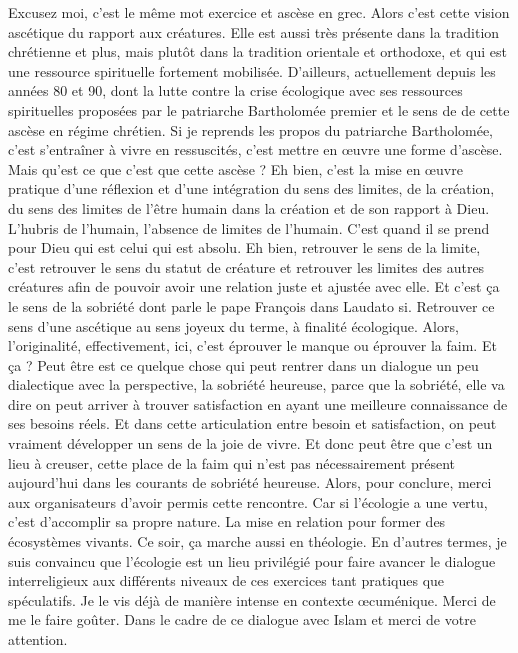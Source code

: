 Excusez moi, c'est le même mot exercice et ascèse en grec. Alors c'est cette vision ascétique du rapport aux créatures. Elle est aussi très présente dans la tradition chrétienne et plus, mais plutôt dans la tradition orientale et orthodoxe, et qui est une ressource spirituelle fortement mobilisée. D'ailleurs, actuellement depuis les années 80 et 90, dont la lutte contre la crise écologique avec ses ressources spirituelles proposées par le patriarche Bartholomée premier et le sens de de cette ascèse en régime chrétien.
Si je reprends les propos du patriarche Bartholomée, c'est s'entraîner à vivre en ressuscités,  c'est mettre en œuvre une forme d'ascèse. Mais qu'est ce que c'est que cette ascèse ? Eh bien, c'est la mise en œuvre pratique d'une réflexion et d'une intégration du sens des limites, de la création, du sens des limites de l'être humain dans la création et de son rapport à Dieu.
L'hubris de l'humain, l'absence de limites de l'humain. C'est quand il se prend pour Dieu qui est celui qui est absolu. Eh bien, retrouver le sens de la limite, c'est retrouver le sens du statut de créature et retrouver les limites des autres créatures afin de pouvoir avoir une relation juste et ajustée avec elle. Et c'est ça le sens de la sobriété dont parle le pape François dans Laudato si.
Retrouver ce sens d'une ascétique au sens joyeux du terme, à finalité écologique. Alors, l'originalité, effectivement, ici, c'est éprouver le manque ou éprouver la faim. Et ça ? Peut être est ce quelque chose qui peut rentrer dans un dialogue un peu dialectique avec la perspective, la sobriété heureuse, parce que la sobriété, elle va dire on peut arriver à trouver satisfaction en ayant une meilleure connaissance de ses besoins réels.
Et dans cette articulation entre besoin et satisfaction, on peut vraiment développer un sens de la joie de vivre. Et donc peut être que c'est un lieu à creuser, cette place de la faim qui n'est pas nécessairement présent aujourd'hui dans les courants de sobriété heureuse. Alors, pour conclure, merci aux organisateurs d'avoir permis cette rencontre. Car si l'écologie a une vertu, c'est d'accomplir sa propre nature.
La mise en relation pour former des écosystèmes vivants. Ce soir, ça marche aussi en théologie. En d'autres termes, je suis convaincu que l'écologie est un lieu privilégié pour faire avancer le dialogue interreligieux aux différents niveaux de ces exercices tant pratiques que spéculatifs. Je le vis déjà de manière intense en contexte œcuménique. Merci de me le faire goûter. Dans le cadre de ce dialogue avec Islam et merci de votre attention.




